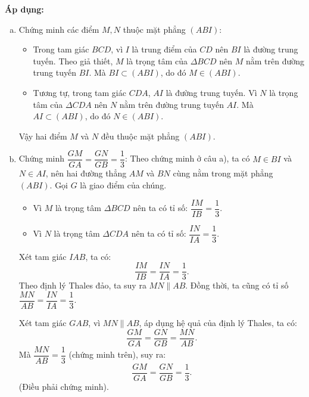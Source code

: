 \begin{vd}
{		\textbf{Áp dụng:}
		\begin{enumerate}[a)]
			\item  Chứng minh các điểm $M, N$ thuộc mặt phẳng $(ABI)$:
		\begin{itemize}
		\item Trong tam giác $BCD$, vì $I$ là trung điểm của $CD$ nên $BI$ là đường trung tuyến.
		Theo giả thiết, $M$ là trọng tâm của $\Delta BCD$ nên $M$ nằm trên đường trung tuyến $BI$.
		Mà $BI \subset (ABI)$, do đó $M \in (ABI)$.
		\item Tương tự, trong tam giác $CDA$, $AI$ là đường trung tuyến.
		Vì $N$ là trọng tâm của $\Delta CDA$ nên $N$ nằm trên đường trung tuyến $AI$.
		Mà $AI \subset (ABI)$, do đó $N \in (ABI)$.
	\end{itemize}
Vậy hai điểm $M$ và $N$ đều thuộc mặt phẳng $(ABI)$.
		\item Chứng minh $\dfrac{GM}{GA} = \dfrac{GN}{GB} = \dfrac{1}{3}$:
		Theo chứng minh ở câu a), ta có $M \in BI$ và $N \in AI$, nên hai đường thẳng $AM$ và $BN$ cùng nằm trong mặt phẳng $(ABI)$. Gọi $G$ là giao điểm của chúng.
	\begin{itemize}
	\item Vì $M$ là trọng tâm $\Delta BCD$ nên ta có tỉ số: $\dfrac{IM}{IB} = \dfrac{1}{3}$.
	\item Vì $N$ là trọng tâm $\Delta CDA$ nên ta có tỉ số: $\dfrac{IN}{IA} = \dfrac{1}{3}$.
\end{itemize}
Xét tam giác $IAB$, ta có:
$$ \dfrac{IM}{IB} = \dfrac{IN}{IA} = \dfrac{1}{3}. $$
Theo định lý Thales đảo, ta suy ra $MN \parallel AB$.
Đồng thời, ta cũng có tỉ số $\dfrac{MN}{AB} = \dfrac{IN}{IA} = \dfrac{1}{3}$.

Xét tam giác $GAB$, vì $MN \parallel AB$, áp dụng hệ quả của định lý Thales, ta có:
$$ \dfrac{GM}{GA} = \dfrac{GN}{GB} = \dfrac{MN}{AB}. $$
Mà $\dfrac{MN}{AB} = \dfrac{1}{3}$ (chứng minh trên), suy ra:
$$ \dfrac{GM}{GA} = \dfrac{GN}{GB} = \dfrac{1}{3}. $$
(Điều phải chứng minh).
		\end{enumerate}
	}
\end{vd}
